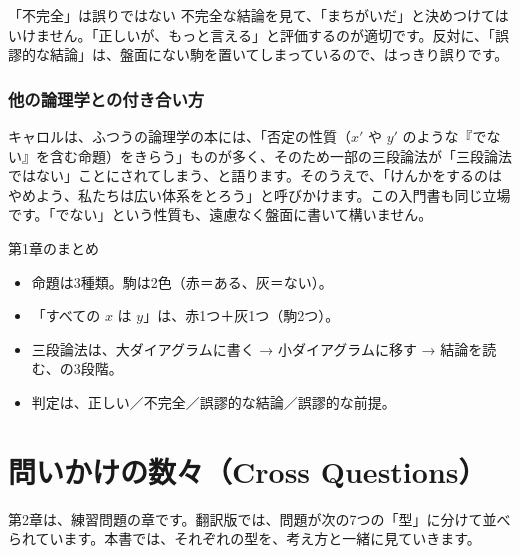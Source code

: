\documentclass[a4paper,11pt,openany]{ltjsbook}
\begin{document}
\begin{notebox}{「不完全」は誤りではない}
不完全な結論を見て、「まちがいだ」と決めつけてはいけません。「正しいが、もっと言える」と評価するのが適切です。反対に、「誤謬的な結論」は、盤面にない駒を置いてしまっているので、はっきり誤りです。
\end{notebox}

\subsection{他の論理学との付き合い方}

キャロルは、ふつうの論理学の本には、「否定の性質（$x'$ や $y'$ のような『でない』を含む命題）をきらう」ものが多く、そのため一部の三段論法が「三段論法ではない」ことにされてしまう、と語ります。そのうえで、「けんかをするのはやめよう、私たちは広い体系をとろう」と呼びかけます。この入門書も同じ立場です。「でない」という性質も、遠慮なく盤面に書いて構いません。

\begin{pointbox}{第1章のまとめ}
\begin{itemize}[leftmargin=1.5em]
\item 命題は3種類。駒は2色（赤＝ある、灰＝ない）。
\item 「すべての $x$ は $y$」は、赤1つ＋灰1つ（駒2つ）。
\item 三段論法は、大ダイアグラムに書く → 小ダイアグラムに移す → 結論を読む、の3段階。
\item 判定は、正しい／不完全／誤謬的な結論／誤謬的な前提。
\end{itemize}
\end{pointbox}

\chapter{問いかけの数々（Cross Questions）}

第2章は、練習問題の章です。翻訳版では、問題が次の7つの「型」に分けて並べられています。本書では、それぞれの型を、考え方と一緒に見ていきます。
\end{document}
